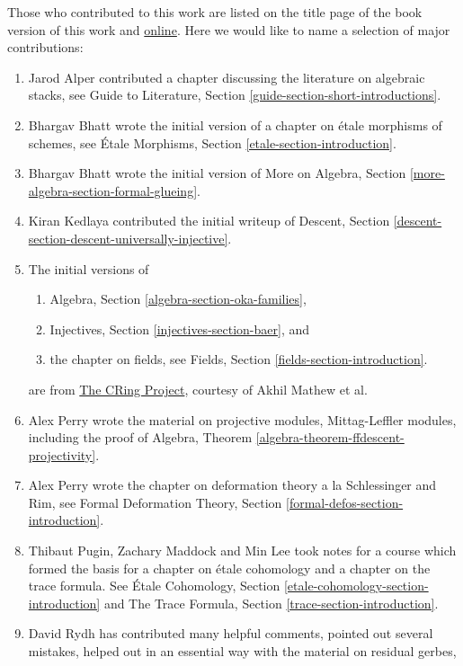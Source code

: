 \medskip\noindent
Those who contributed to this work are listed on the title page of the book
version of this work and
\href{https://stacks.math.columbia.edu/tex/CONTRIBUTORS}{online}.
Here we would like to name a selection of major contributions:
\begin{enumerate}
\item Jarod Alper contributed a chapter discussing the literature
on algebraic stacks, see
Guide to Literature, Section \ref{guide-section-short-introductions}.
\item Bhargav Bhatt wrote the initial version of a chapter
on \'etale morphisms of schemes, see
\'Etale Morphisms, Section \ref{etale-section-introduction}.
\item Bhargav Bhatt wrote the initial version of
More on Algebra, Section \ref{more-algebra-section-formal-glueing}.
\item Kiran Kedlaya contributed the initial writeup of
Descent, Section \ref{descent-section-descent-universally-injective}.
\item The initial versions of
\begin{enumerate}
\item Algebra, Section \ref{algebra-section-oka-families},
\item Injectives, Section \ref{injectives-section-baer}, and
\item the chapter on fields, see
Fields, Section \ref{fields-section-introduction}.
\end{enumerate}
are from
\href{https://math.uchicago.edu/~amathew/cr.html}{The CRing Project},
courtesy of Akhil Mathew et al.
\item Alex Perry wrote the material on projective modules,
Mittag-Leffler modules, including the proof of
Algebra, Theorem \ref{algebra-theorem-ffdescent-projectivity}.
\item Alex Perry wrote the chapter on deformation theory a la Schlessinger
and Rim, see
Formal Deformation Theory, Section \ref{formal-defos-section-introduction}.
\item Thibaut Pugin, Zachary Maddock and Min Lee took notes for
a course which formed the basis for a chapter on \'etale cohomology
and a chapter on the trace formula. See
\'Etale Cohomology, Section \ref{etale-cohomology-section-introduction}
and
The Trace Formula, Section \ref{trace-section-introduction}.
\item David Rydh has contributed many helpful comments, pointed out several
mistakes, helped out in an essential way with the material on residual gerbes,

\end{enumerate}
